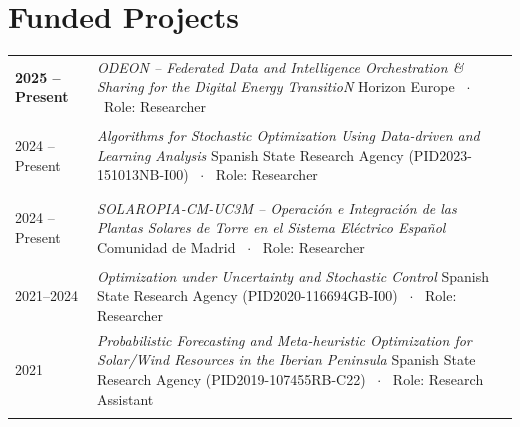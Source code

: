 \documentclass[10pt,a4paper]{article}
\makeatletter
\newenvironment{cvtable}
  {\begin{longtable}{@{} >{\raggedright\arraybackslash\bfseries}p{0.135\textwidth}
                        !{\color{rulegray}\vrule width 0.9pt}
                        >{\raggedright\arraybackslash}p{0.83\textwidth} @{}}}
  {\end{longtable}}
\newcommand{\cvitem}[2]{%
  #1 & #2 \tabularnewline \noalign{\vskip 4pt}%
}
\makeatother
\begin{document}
\section*{Funded Projects}
\begin{cvtable}
    \cvitem{2025 -- Present}{\textit{ODEON -- Federated Data and Intelligence Orchestration
    \& Sharing for the Digital Energy TransitioN}\newline
    {\color{mutedtext}Horizon Europe \ $\cdot$ \ Role: Researcher}}

    \cvitem{2024 -- Present}{\textit{Algorithms for Stochastic Optimization Using
    Data-driven and Learning Analysis}\newline
    {\color{mutedtext}Spanish State Research Agency (PID2023-151013NB-I00) \ $\cdot$ \ Role: Researcher}}

    \cvitem{2024 -- Present}{\textit{SOLAROPIA-CM-UC3M -- Operaci\'on e Integraci\'on de
    las Plantas Solares de Torre en el Sistema El\'ectrico Espa\~nol}\newline
    {\color{mutedtext}Comunidad de Madrid \ $\cdot$ \ Role: Researcher}}

    \cvitem{2021--2024}{\textit{Optimization under Uncertainty and Stochastic Control}\newline
    {\color{mutedtext}Spanish State Research Agency (PID2020-116694GB-I00) \ $\cdot$ \ Role: Researcher}}

    \cvitem{2021}{\textit{Probabilistic Forecasting and Meta-heuristic Optimization for
    Solar/Wind Resources in the Iberian Peninsula}\newline
    {\color{mutedtext}Spanish State Research Agency (PID2019-107455RB-C22) \ $\cdot$ \ Role: Research Assistant}}
\end{cvtable}

\end{document}
